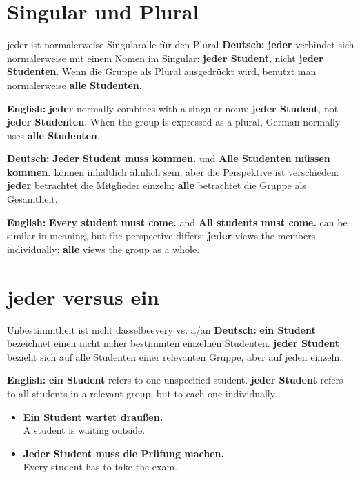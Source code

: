 \documentclass[a4paper,11pt]{article}
\newcommand{\GermanText}[1]{\textbf{Deutsch: }#1\par}
\newcommand{\EnglishText}[1]{{\small\color{SoftGray}\textbf{English: }#1\par}}
\newcommand{\ExampleItem}[2]{\item \textbf{#1}\\{\small\color{SoftGray}#2}}
\begin{document}
\section{Singular und Plural}
\begin{grammarentry}{jeder ist normalerweise Singular}{alle für den Plural}
\GermanText{\textbf{jeder} verbindet sich normalerweise mit einem Nomen im Singular: \textbf{jeder Student}, nicht \textbf{jeder Studenten}. Wenn die Gruppe als Plural ausgedrückt wird, benutzt man normalerweise \textbf{alle Studenten}.}
\EnglishText{\textbf{jeder} normally combines with a singular noun: \textbf{jeder Student}, not \textbf{jeder Studenten}. When the group is expressed as a plural, German normally uses \textbf{alle Studenten}.}
\GermanText{\textbf{Jeder Student muss kommen.} und \textbf{Alle Studenten müssen kommen.} können inhaltlich ähnlich sein, aber die Perspektive ist verschieden: \textbf{jeder} betrachtet die Mitglieder einzeln; \textbf{alle} betrachtet die Gruppe als Gesamtheit.}
\EnglishText{\textbf{Every student must come.} and \textbf{All students must come.} can be similar in meaning, but the perspective differs: \textbf{jeder} views the members individually; \textbf{alle} views the group as a whole.}
\end{grammarentry}

\section{jeder versus ein}
\begin{grammarentry}{Unbestimmtheit ist nicht dasselbe}{every vs. a/an}
\GermanText{\textbf{ein Student} bezeichnet einen nicht näher bestimmten einzelnen Studenten. \textbf{jeder Student} bezieht sich auf alle Studenten einer relevanten Gruppe, aber auf jeden einzeln.}
\EnglishText{\textbf{ein Student} refers to one unspecified student. \textbf{jeder Student} refers to all students in a relevant group, but to each one individually.}
\end{grammarentry}

\begin{exbox}
\begin{itemize}
\ExampleItem{Ein Student wartet draußen.}{A student is waiting outside.}
\ExampleItem{Jeder Student muss die Prüfung machen.}{Every student has to take the exam.}
\end{itemize}
\end{exbox}
\end{document}
